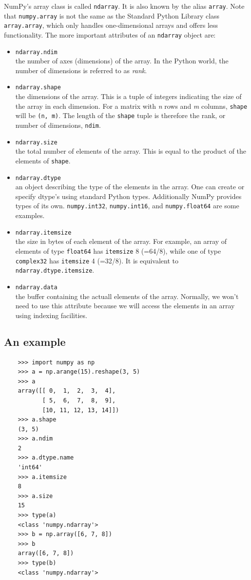 \documentclass[UTF8]{article}
\begin{document}
NumPy's array class is called \texttt{ndarray}. It is also known by the alias \texttt{array}. Note
that \texttt{numpy.array} is not the same as the Standard Python Library class \texttt{array.array},
which only handles one-dimensional arrays and offers less functionality. The more important
attributes of an \texttt{ndarray} object are:
\begin{itemize}
    \item \texttt{ndarray.ndim} \\
    the number of axes (dimensions) of the array. In the Python world, the number of dimensions is
    referred to as \emph{rank}.
    \item \texttt{ndarray.shape} \\
    the dimensions of the array. This is a tuple of integers indicating the size of the array in
    each dimension. For a matrix with \emph{n} rows and \emph{m} columns, \texttt{shape} will be
    \texttt{(n, m)}. The length of the \texttt{shape} tuple is therefore the rank, or number of
    dimensions, \texttt{ndim}.
    \item \texttt{ndarray.size} \\
    the total number of elements of the array. This is equal to the product of the elements of
    \texttt{shape}.
    \item \texttt{ndarray.dtype} \\
    an object describing the type of the elements in the array. One can create or specify dtype's
    using standard Python types. Additionally NumPy provides types of its own. \texttt{numpy.int32},
    \texttt{numpy.int16}, and \texttt{numpy.float64} are some examples.
    \item \texttt{ndarray.itemsize} \\
    the size in bytes of each element of the array. For example, an array of elements of type
    \texttt{float64} has \texttt{itemsize} 8 (=64/8), while one of type \texttt{complex32} has
    \texttt{itemsize} 4 (=32/8). It is equivalent to \texttt{ndarray.dtype.itemsize}.
    \item \texttt{ndarray.data} \\
    the buffer containing the actuall elements of the array. Normally, we won't need to use this
    attribute because we will access the elements in an array using indexing facilities.
\end{itemize}

\subsection{An example}
\begin{verbatim}
    >>> import numpy as np
    >>> a = np.arange(15).reshape(3, 5)
    >>> a
    array([[ 0,  1,  2,  3,  4],
           [ 5,  6,  7,  8,  9],
           [10, 11, 12, 13, 14]])
    >>> a.shape
    (3, 5)
    >>> a.ndim
    2
    >>> a.dtype.name
    'int64'
    >>> a.itemsize
    8
    >>> a.size
    15
    >>> type(a)
    <class 'numpy.ndarray'>
    >>> b = np.array([6, 7, 8])
    >>> b
    array([6, 7, 8])
    >>> type(b)
    <class 'numpy.ndarray'>
\end{verbatim}
\end{document}
